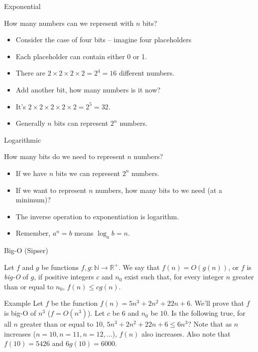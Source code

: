 \documentclass{beamer}
\begin{document}
  
\begin{frame}{Exponential}
  \begin{exampleblock}{How many numbers can we represent with $n$ bits?}
    \begin{itemize}
      \item Consider the case of four bits -- imagine four placeholders \textbf{}\textbf{}\textbf{}\textbf{}
      \item Each placeholder can contain either 0 or 1.
      \item There are $2 \times 2 \times 2 \times 2 = 2^4 = 16$ different numbers.
      \item Add another bit, how many numbers is it now?
      \item It's $2 \times 2 \times 2 \times 2 \times 2 = 2^5 = 32$.
      \item Generally $n$ bits can represent $2^n$ numbers.
    \end{itemize}
  \end{exampleblock}
\end{frame}
  
  
\begin{frame}{Logarithmic}
  \begin{exampleblock}{How many bits do we need to represent $n$ numbers?}
    \begin{itemize}
      \item If we have $n$ bits we can represent $2^n$ numbers.
      \item If we want to represent $n$ numbers, how many bits to we need (at a minimum)?
      \item The inverse operation to exponentiation is logarithm.
      \item Remember, $a^n = b$ means $\log_a b = n$.
    \end{itemize}
  \end{exampleblock}
\end{frame}
  
\begin{frame}{Big-O (Sipser)}
  \begin{definition}
    Let $f$ and $g$ be functions $f,g: \mathbb{N} \rightarrow \mathbb{R}^+$.
    We say that $f(n) = O(g(n))$, or $f$ is \emph{big-O} of $g$, if positive integers $c$ and $n_0$ exist such that, for every integer $n$ greater than or equal to $n_0$, $f(n) \le cg(n)$.
  \end{definition}
  \begin{exampleblock}{Example}
    Let $f$ be the function $f(n) = 5n^3 + 2n^2 + 22n + 6$.
    We'll prove that $f$ is big-O of $n^3$ ($f = O(n^3)$).
    Let $c$ be $6$ and $n_0$ be $10$.
    Is the following true, for all $n$ greater than or equal to 10, $5n^3 + 2n^2 + 22n + 6 \le 6n^3$?
    Note that as $n$ increases ($n=10,n=11,n=12,\ldots$), $f(n)$ also increases.
    Also note that $f(10) = 5426$ and $6g(10) = 6000$.
  \end{exampleblock}
\end{frame}
  
\end{document}
